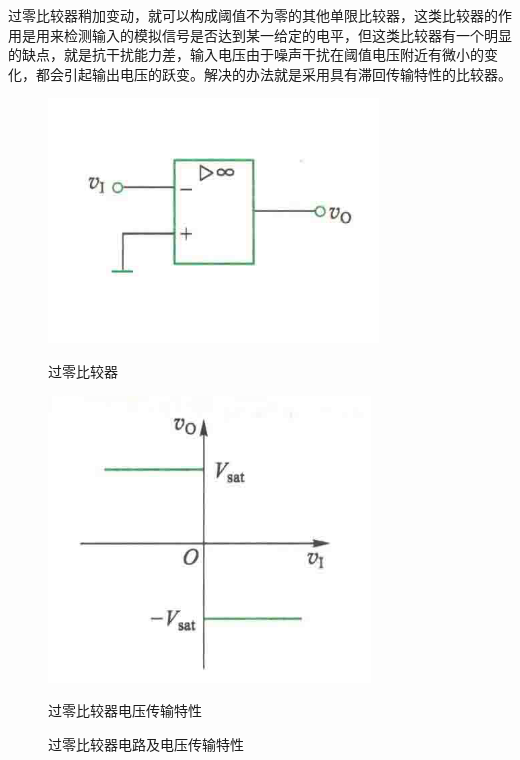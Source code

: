 \documentclass[10pt, a4paper]{article} %
\begin{document}
过零比较器稍加变动，就可以构成阈值不为零的其他单限比较器，这类比较器的作用是用来检测输入的模拟信号是否达到某一给定的电平，但这类比较器有一个明显的缺点，就是抗干扰能力差，输入电压由于噪声干扰在阈值电压附近有微小的变化，都会引起输出电压的跃变。解决的办法就是采用具有滞回传输特性的比较器。

\begin{figure}[htbp]
    \centering
    \begin{minipage}{0.45\textwidth}
        \centering
        \includegraphics[width=\textwidth]{image/3.png}
        \caption{过零比较器}
    \end{minipage}
    \hfill
    \begin{minipage}{0.45\textwidth}
        \centering
        \includegraphics[width=\textwidth]{image/4.png}
        \caption{过零比较器电压传输特性}
    \end{minipage}
    \caption{过零比较器电路及电压传输特性}
    \label{fig:zero_crossing}
\end{figure}
\end{document}

